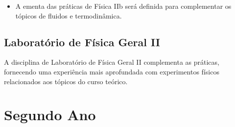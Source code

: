 \documentclass[a4paper, 12pt]{article}
\newcounter{fis}
\begin{document}
\begin{tcolorbox}[title=Ementa Prática de Física IIb:]
    \begin{itemize}
        \item A ementa das práticas de Física IIb será definida para complementar os
              tópicos de fluidos e termodinâmica.
    \end{itemize}
\end{tcolorbox}

\subsection{Laboratório de Física Geral II}
\label{fis006}

A disciplina de Laboratório de Física Geral II complementa as práticas, fornecendo uma
experiência mais aprofundada com experimentos físicos relacionados aos tópicos do curso
teórico.

\pagebreak

\section{Segundo Ano}
\label{segundoano}
\end{document}
